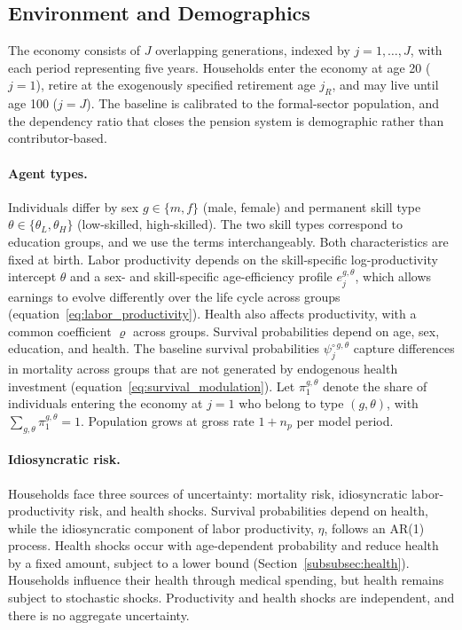 \documentclass[12pt,a4paper]{article}
\begin{document}
\subsection{Environment and Demographics}
\label{subsec:environment}

The economy consists of $J$ overlapping generations, indexed by $j = 1, \ldots, J$, with each period representing five years. Households enter the economy at age 20 ($j = 1$), retire at the exogenously specified retirement age $j_R$, and may live until age 100 ($j = J$). The baseline is calibrated to the formal-sector population, and the dependency ratio that closes the pension system is demographic rather than contributor-based.

\paragraph{Agent types.}
Individuals differ by sex $g \in \{m, f\}$ (male, female) and permanent skill type $\theta \in \{\theta_L, \theta_H\}$ (low-skilled, high-skilled). The two skill types correspond to education groups, and we use the terms interchangeably. Both characteristics are fixed at birth. Labor productivity depends on the skill-specific log-productivity intercept $\theta$ and a sex- and skill-specific age-efficiency profile $e_j^{g,\theta}$, which allows earnings to evolve differently over the life cycle across groups (equation~\eqref{eq:labor_productivity}). Health also affects productivity, with a common coefficient $\varrho$ across groups. Survival probabilities depend on age, sex, education, and health. The baseline survival probabilities $\psi^{\circ\,g,\theta}_j$ capture differences in mortality across groups that are not generated by endogenous health investment (equation~\eqref{eq:survival_modulation}). Let $\pi^{g,\theta}_1$ denote the share of individuals entering the economy at $j=1$ who belong to type $(g,\theta)$, with $\sum_{g,\theta}\pi^{g,\theta}_1=1$. Population grows at gross rate $1+n_p$ per model period.


\paragraph{Idiosyncratic risk.}
Households face three sources of uncertainty: mortality risk, idiosyncratic labor-productivity risk, and health shocks. Survival probabilities depend on health, while the idiosyncratic component of labor productivity, $\eta$, follows an AR(1) process. Health shocks occur with age-dependent probability and reduce health by a fixed amount, subject to a lower bound (Section~\ref{subsubsec:health}). Households influence their health through medical spending, but health remains subject to stochastic shocks. Productivity and health shocks are independent, and there is no aggregate uncertainty.
\end{document}
